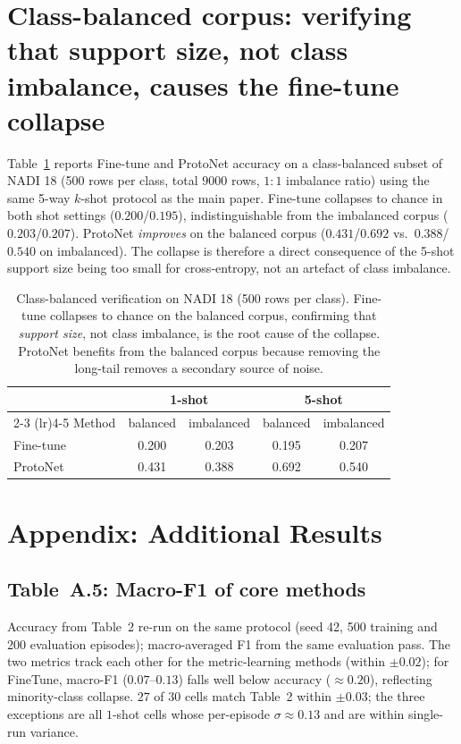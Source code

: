 \documentclass[11pt,a4paper]{article}
\begin{document}
\section{Class-balanced corpus: verifying that support size, not class imbalance, causes the fine-tune collapse}

Table~\ref{tab:balanced} reports Fine-tune and ProtoNet accuracy on a
class-balanced subset of NADI 18 (500 rows per class, total $9000$ rows,
$1{:}1$ imbalance ratio) using the same 5-way $k$-shot protocol as the
main paper. Fine-tune collapses to chance in both shot settings
($0.200$/$0.195$), indistinguishable from the imbalanced corpus
($0.203$/$0.207$). ProtoNet \emph{improves} on the balanced corpus
($0.431$/$0.692$ vs.\ $0.388$/$0.540$ on imbalanced). The collapse is
therefore a direct consequence of the 5-shot support size being too
small for cross-entropy, not an artefact of class imbalance.

\begin{table}[h]
\centering\small
\begin{tabular}{lcccc}
\toprule
                  & \multicolumn{2}{c}{1-shot} & \multicolumn{2}{c}{5-shot} \\
\cmidrule(lr){2-3} \cmidrule(lr){4-5}
Method            & balanced & imbalanced & balanced & imbalanced \\
\midrule
Fine-tune         & 0.200    & 0.203      & 0.195    & 0.207 \\
ProtoNet          & 0.431    & 0.388      & 0.692    & 0.540 \\
\bottomrule
\end{tabular}
\caption{Class-balanced verification on NADI 18 (500 rows per class).
Fine-tune collapses to chance on the balanced corpus, confirming
that \emph{support size}, not class imbalance, is the root cause of
the collapse. ProtoNet benefits from the balanced corpus because
removing the long-tail removes a secondary source of noise.}
\label{tab:balanced}
\end{table}
\section{Appendix: Additional Results}

\subsection{Table~A.5: Macro-F1 of core methods}
Accuracy from Table~2 re-run on the same protocol (seed 42, 500
training and 200 evaluation episodes); macro-averaged F1 from
the same evaluation pass. The two metrics track each other for
the metric-learning methods (within $\pm0.02$); for FineTune,
macro-F1 ($0.07$--$0.13$) falls well below accuracy
(${\approx}0.20$), reflecting minority-class collapse. $27$ of
$30$ cells match Table~2 within $\pm0.03$; the three exceptions
are all $1$-shot cells whose per-episode $\sigma{\approx}0.13$
and are within single-run variance.
\end{document}
